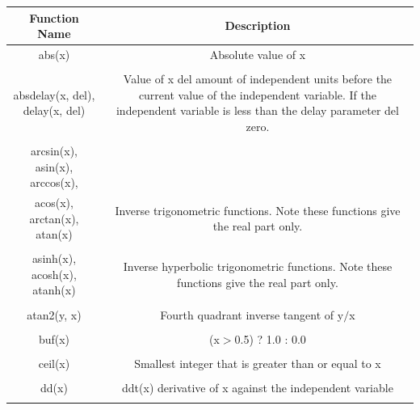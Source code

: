 \begin{longtable}{c c}

\hline\hline %
Function Name & Description \\ [0.5ex] %
\hline %
abs(x) & Absolute value of x \\ \\ %

absdelay(x, del), delay(x, del) & \begin{minipage}{20em}
Value of x del amount of independent units before the current value of the independent variable. If the independent variable is less than the delay parameter del zero.
\end{minipage}\\ \\

arcsin(x), asin(x), arccos(x),\\ 
acos(x), arctan(x), atan(x) & \begin{minipage}{20em}
Inverse trigonometric functions. Note these functions give the real part only.
\end{minipage}\\ \\

asinh(x), acosh(x), atanh(x) & \begin{minipage}{20em}
Inverse hyperbolic trigonometric functions. Note these functions give the real part only.
\end{minipage}\\ \\

atan2(y, x) & \begin{minipage}{20em}
Fourth quadrant inverse tangent of y$/$x
\end{minipage}\\ \\

buf(x) & \begin{minipage}{20em}
(x$>$0.5) ? 1.0 : 0.0
\end{minipage}\\ \\

ceil(x) & \begin{minipage}{20em}
Smallest integer that is greater than or equal to x
\end{minipage}\\ \\

dd(x) & \begin{minipage}{20em}
ddt(x) derivative of x against the independent variable
\end{minipage}\\ \\


\end{longtable}
